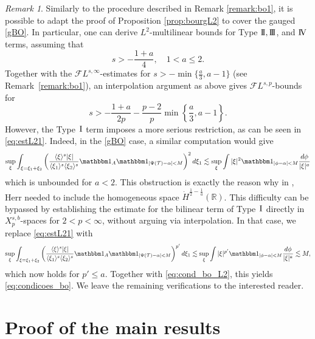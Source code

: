 \documentclass[a4paper,
11pt,  reqno]{amsart}
\newcommand{\I}{\hspace{0.2mm}\textup{I}\hspace{0.2mm}}
\newcommand{\II}{\textup{I \hspace{-2.9mm} I} }
\newcommand{\III}{\textup{I \hspace{-2.9mm} I \hspace{-2.9mm} I}}
\newcommand{\IV}{\textup{I \hspace{-2.9mm} V}}
\newcommand{\5}{\textup{V}}
\newcommand{\FL}{\mathcal{F} L}
\newcommand{\ind}{\mathbbm 1}
\newcommand{\les}{\lesssim}
\theoremstyle{remark}
\newtheorem{remark}[theorem]{Remark}
\newcommand{\R}{\mathbb{R}}
\newcommand{\TT}{\mathcal{T}}
\newcommand{\al}{\alpha}
\newcommand{\jb}[1]
{\langle #1 \rangle}
\numberwithin{equation}{section}
\numberwithin{theorem}{section}
\begin{document}
\begin{remark}
    \label{remark:bo2} 
    Similarly to the procedure described in Remark \ref{remark:bo1}, it is possible to adapt the proof of Proposition \ref{prop:bourgL2} to cover the gauged \eqref{gBO}. In particular, one can derive $L^2$-multilinear bounds for Type $\II, \III$, and $\IV$ terms, assuming that
    $$
    s>-\frac{1+a}{4}, \quad  1<a\le 2. 
    $$
    Together with the $\FL^{s,\infty}$-estimates 
    for $s>-\min\{\frac a3, a-1\}$ (see Remark~\ref{remark:bo1}),
    an interpolation argument as above gives $\FL^{s,p}$-bounds for 
\begin{equation}\label{eq:cond_bo_L2}
        s>-\frac{1+a}{2p} - \frac{p-2}{p}\min\left\{\frac{a}3, a-1\right\}.
\end{equation}
However, the Type $\I$ term imposes a more serious restriction, as can be seen in \eqref{eq:estL21}. Indeed, in the \eqref{gBO} case, a similar computation would give
\begin{align}
\sup_\xi \int_{\xi=\xi_1+\xi_2} \left(\frac{\jb{\xi}^{s} |\xi| }{\jb{\xi_1}^{s}\jb{\xi_2}^{s}} 
    \ind_A \ind_{|\Psi(\TT) - \al| < M } \right)^{2} d\xi_1
    \les \sup_\xi \int |\xi|^2 \ind_{|\phi - \al| < M } \frac{d\phi}{|\xi|^a } 
\end{align}
    which is unbounded for $a<2$. This obstruction is exactly the reason why in \cite{herr_bo}, Herr
    needed to include the homogeneous space $\dot H^{\frac12 - \frac1a}(\R)$. 
    This difficulty can be bypassed by establishing the estimate for the bilinear term of Type $\I$ directly in $X^{s, b}_p$-spaces for $2<p<\infty$, without arguing via interpolation. In that case, we replace \eqref{eq:estL21} with
    \begin{align}
    \sup_\xi \int_{\xi=\xi_1+\xi_2} \left(\frac{\jb{\xi}^{s} |\xi| }{\jb{\xi_1}^{s}\jb{\xi_2}^{s}} 
    \ind_A \ind_{|\Psi(\TT) - \al| < M } \right)^{p'} d\xi_1
    \les \sup_\xi \int |\xi|^{p'} \ind_{|\phi - \al| < M } \frac{d\phi}{|\xi|^a } \lesssim M, 
\end{align}
which now holds for $p'\le a$. Together with \eqref{eq:cond_bo_L2}, this yields \eqref{eq:condicoes_bo}. We leave the remaining verifications to the interested reader.
\end{remark}





\section{Proof of the main results}\label{sec:lwp}
\end{document}

